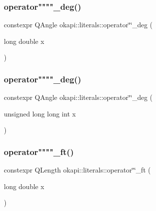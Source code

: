 \mbox{\label{namespaceokapi_1_1literals_afc22181ee7d38722369c5f4cb685e641}} 
\subsubsection{\texorpdfstring{operator""""\_deg()}{operator""\_deg()}\hspace{0.1cm}{\footnotesize\ttfamily [1/2]}}
{\footnotesize\ttfamily constexpr Q\+Angle okapi\+::literals\+::operator\char`\"{}\char`\"{}\+\_\+deg (\begin{DoxyParamCaption}\item[{long double}]{x }\end{DoxyParamCaption})}

\mbox{\label{namespaceokapi_1_1literals_abbb7d5973f364cb7d6778d14409693eb}} 
\subsubsection{\texorpdfstring{operator""""\_deg()}{operator""\_deg()}\hspace{0.1cm}{\footnotesize\ttfamily [2/2]}}
{\footnotesize\ttfamily constexpr Q\+Angle okapi\+::literals\+::operator\char`\"{}\char`\"{}\+\_\+deg (\begin{DoxyParamCaption}\item[{unsigned long long int}]{x }\end{DoxyParamCaption})}

\mbox{\label{namespaceokapi_1_1literals_ae92924d9cc4e948130b70ccba8687a3a}} 
\subsubsection{\texorpdfstring{operator""""\_ft()}{operator""\_ft()}\hspace{0.1cm}{\footnotesize\ttfamily [1/2]}}
{\footnotesize\ttfamily constexpr Q\+Length okapi\+::literals\+::operator\char`\"{}\char`\"{}\+\_\+ft (\begin{DoxyParamCaption}\item[{long double}]{x }\end{DoxyParamCaption})}

